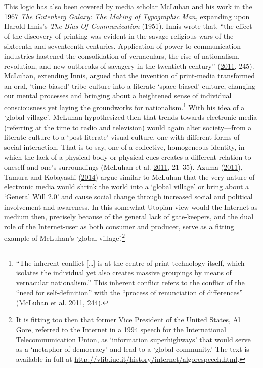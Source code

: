 \documentclass[10pt,british,A4paper,twoside]{memoir}
\begin{document}
This logic has also been covered by media scholar McLuhan and his work
in the 1967 \emph{The Gutenberg Galaxy: The Making of Typographic Man},
expanding upon Harold Innis's \emph{The Bias Of Communication} (1951).
Innis wrote that, ``the effect of the discovery of printing was evident
in the savage religious wars of the sixteenth and seventeenth centuries.
Application of power to communication industries hastened the
consolidation of vernaculars, the rise of nationalism, revolution, and
new outbreaks of savagery in the twentieth century''
(\protect\hyperlink{ref-mcluhan_gutenberg_2011}{2011}, 245). McLuhan,
extending Innis, argued that the invention of print-media transformed an
oral, `time-biased' tribe culture into a literate `space-biased'
culture, changing our mental processes and bringing about a heightened
sense of individual consciousness yet laying the groundworks for
nationalism.\footnote{``The inherent conflict {[}\ldots{}{]} is at the
  centre of print technology itself, which isolates the individual yet
  also creates massive groupings by means of vernacular nationalism.''
  This inherent conflict refers to the conflict of the ``need for
  self-definition'' with the ``process of renunciation of differences''
  (McLuhan et al. \protect\hyperlink{ref-mcluhan_gutenberg_2011}{2011},
  244).} With his idea of a `global village', McLuhan hypothesized then
that trends towards electronic media (referring at the time to radio and
television) would again alter society---from a literate culture to a
`post-literate' visual culture, one with different forms of social
interaction. That is to say, one of a collective, homogeneous identity,
in which the lack of a physical body or physical cues creates a
different relation to oneself and one's surroundings (McLuhan et al.
\protect\hyperlink{ref-mcluhan_gutenberg_2011}{2011}, 21--35).  Azuma (\protect\hyperlink{ref-azuma_ippan_2011}{2011}), Tamura and Kobayashi
(\protect\hyperlink{ref-tamura_niggling_2014}{2014}) argue similar to
McLuhan that the very nature of electronic media would shrink the
world into a `global village' or bring about a `General Will 2.0' and
cause social change through increased social and political involvement
and awareness. In this somewhat Utopian view would the Internet as medium then,
precisely because of the general lack of gate-keepers, and the dual role
of the Internet-user as both consumer and producer, serve as a fitting
example of McLuhan's `global village'.\footnote{It is fitting too
  then that former Vice President of the United States, Al Gore,
  referred to the Internet in a 1994 speech for the International
  Telecommunication Union, as `information superhighways' that would
  serve as a `metaphor of democracy' and lead to a `global community.'
  The text is available in full at
  \url{http://vlib.iue.it/history/internet/algorespeech.html}.}
\end{document}
